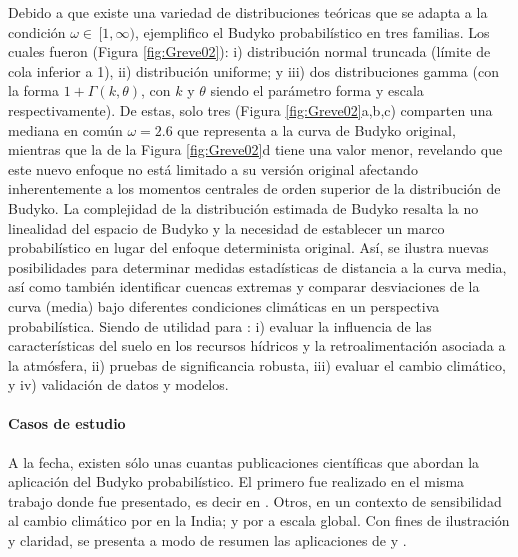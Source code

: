 \documentclass[12pt]{article}
\begin{document}
Debido a que existe una variedad de distribuciones teóricas que se adapta a la condición $\omega \in\,[1,\infty)$, \citet{Greve2015} ejemplifico el Budyko probabilístico en tres familias. Los cuales fueron (Figura \ref{fig:Greve02}): i) distribución normal truncada (límite de cola inferior a 1), ii) distribución uniforme; y iii) dos distribuciones gamma (con la forma $1 + \Gamma (k, \theta )$, con $k$ y $\theta$ siendo el parámetro forma y escala respectivamente). De estas, solo tres (Figura \ref{fig:Greve02}a,b,c) comparten una mediana en común $\omega = 2.6$ que representa a la curva de Budyko original, mientras que la de la Figura \ref{fig:Greve02}d tiene una valor menor, revelando que este nuevo enfoque no está limitado a su versión original afectando inherentemente a los momentos centrales de orden superior de la distribución de Budyko. La complejidad de la distribución estimada de Budyko resalta la no linealidad del espacio de Budyko y la necesidad de establecer un marco probabilístico en lugar del enfoque determinista original. Así, se ilustra nuevas posibilidades para determinar medidas estadísticas de distancia a la curva media, así como también identificar cuencas extremas y comparar desviaciones de la curva (media) bajo diferentes condiciones climáticas en un perspectiva probabilística. Siendo de utilidad para : i) evaluar la influencia de las características del suelo en los recursos hídricos y la retroalimentación asociada a la atmósfera, ii) pruebas de significancia robusta, iii) evaluar el cambio climático, y iv) validación de datos y modelos.


\thispagestyle{empty}

\paragraph{Casos de estudio}\mbox{}

A la fecha, existen sólo unas cuantas publicaciones científicas que abordan la aplicación del Budyko probabilístico. El primero fue realizado en el misma trabajo donde fue presentado, es decir en \citet{Greve2015}. Otros, en un contexto de sensibilidad al cambio climático por \cite{Singh2015} en la India; y por \citet{gudmundsson2016sensitivity} a escala global. Con fines de ilustración y claridad, se presenta a modo de resumen las aplicaciones de \citet{Greve2015} y \citet{Singh2015}.


\clearpage

\clearpage
\end{document}

